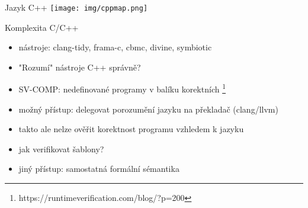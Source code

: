 \documentclass[11pt]{beamer}
\begin{document}
\begin{frame}{Jazyk C++}
\texttt{[image: img/cppmap.png]}
\end{frame}


%
%




\begin{frame}{Komplexita C/C++}
\begin{itemize}
\pause \item nástroje: clang-tidy, frama-c, cbmc, divine, symbiotic
\pause \item "Rozumí" nástroje C++ správně?
\pause \item SV-COMP: nedefinované programy v balíku korektních \footnote[frame]{https://runtimeverification.com/blog/?p=200}
\pause \item možný přístup: delegovat porozumění jazyku na překladač (clang/llvm)
\pause \item takto ale nelze ověřit korektnost programu vzhledem k jazyku
\pause \item jak verifikovat šablony?
\pause \item jiný přístup: samostatná formální sémantika
\end{itemize}
\end{frame}
\end{document}
